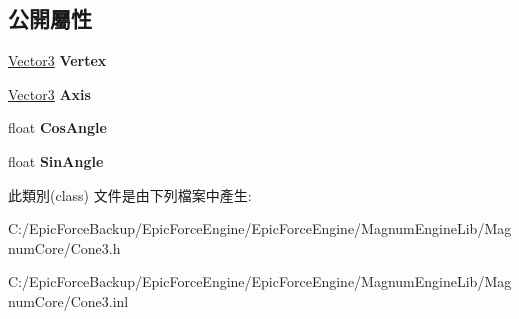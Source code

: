 \subsection*{公開屬性}
\begin{DoxyCompactItemize}
\item 
\hyperlink{class_magnum_1_1_vector3}{Vector3} {\bfseries Vertex}\hypertarget{class_magnum_1_1_cone3_ac0016b524d15b1a26a94b78d9237d71f}{}\label{class_magnum_1_1_cone3_ac0016b524d15b1a26a94b78d9237d71f}

\item 
\hyperlink{class_magnum_1_1_vector3}{Vector3} {\bfseries Axis}\hypertarget{class_magnum_1_1_cone3_afe6d45101f6c0a676e7090f38f00a867}{}\label{class_magnum_1_1_cone3_afe6d45101f6c0a676e7090f38f00a867}

\item 
float {\bfseries Cos\+Angle}\hypertarget{class_magnum_1_1_cone3_a0595a2832ff5e63bf467ec976b671a3b}{}\label{class_magnum_1_1_cone3_a0595a2832ff5e63bf467ec976b671a3b}

\item 
float {\bfseries Sin\+Angle}\hypertarget{class_magnum_1_1_cone3_af1525693602f45d54d87eb6acc95d9e7}{}\label{class_magnum_1_1_cone3_af1525693602f45d54d87eb6acc95d9e7}

\end{DoxyCompactItemize}


此類別(class) 文件是由下列檔案中產生\+:\begin{DoxyCompactItemize}
\item 
C\+:/\+Epic\+Force\+Backup/\+Epic\+Force\+Engine/\+Epic\+Force\+Engine/\+Magnum\+Engine\+Lib/\+Magnum\+Core/Cone3.\+h\item 
C\+:/\+Epic\+Force\+Backup/\+Epic\+Force\+Engine/\+Epic\+Force\+Engine/\+Magnum\+Engine\+Lib/\+Magnum\+Core/Cone3.\+inl\end{DoxyCompactItemize}
